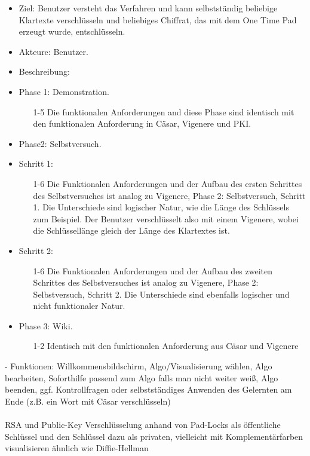 \documentclass{article}
\begin{document}
\begin{itemize}[label={}]
\item Ziel: Benutzer versteht das Verfahren und kann selbstständig beliebige Klartexte verschlüsseln und beliebiges Chiffrat, das mit dem One Time Pad erzeugt wurde, entschlüsseln.
\item Akteure: Benutzer.
\item Beschreibung:
\item Phase 1: Demonstration.
\begin{enumerate}
 \item[1-5] Die funktionalen Anforderungen and diese Phase sind identisch mit den 
            funktionalen Anforderung in Cäsar, Vigenere und PKI.
\end{enumerate}

\item Phase2: Selbstversuch.
\item Schritt 1:
\begin{enumerate}
\item[1-6] Die Funktionalen Anforderungen und der Aufbau des ersten Schrittes des Selbstversuches ist analog zu Vigenere, Phase 2: Selbstversuch, Schritt 1. 
           Die Unterschiede sind logischer Natur, wie die Länge des Schlüssels zum Beispiel. 
           Der Benutzer verschlüsselt also mit einem Vigenere, wobei die Schlüssellänge gleich der Länge des Klartextes ist.
\end{enumerate}

\item Schritt 2:
\begin{enumerate}
\item[1-6] Die Funktionalen Anforderungen und der Aufbau des zweiten Schrittes des Selbstversuches ist analog zu Vigenere, Phase 2: Selbstversuch, Schritt 2. 
           Die Unterschiede sind ebenfalls logischer und nicht funktionaler Natur.
\end{enumerate}
\item Phase 3: Wiki.
\begin{enumerate}
 \item[1-2] Identisch mit den funktionalen Anforderung aus Cäsar und Vigenere
\end{enumerate}
\end{itemize}

- Funktionen: Willkommensbildschirm, Algo/Visualisierung wählen, Algo bearbeiten,
Soforthilfe passend zum Algo falls man nicht weiter weiß, Algo beenden,
ggf. Kontrollfragen oder selbstständiges Anwenden des Gelernten am Ende (z.B. ein Wort mit Cäsar verschlüsseln)
\\
\\
RSA und Public-Key Verschlüsselung anhand von Pad-Locks als
öffentliche Schlüssel und den Schlüssel  dazu als privaten,
vielleicht mit Komplementärfarben visualisieren ähnlich wie Diffie-Hellman
\end{document}
